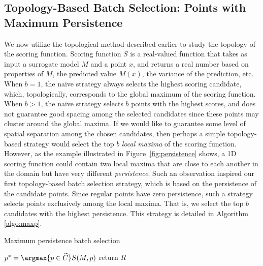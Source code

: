\subsection{Topology-Based Batch Selection: Points with Maximum Persistence}
\label{subsection:topology-maxp}

We now utilize the topological method described earlier to study the topology of the scoring function.
%
Scoring function $S$ is a real-valued function that takes as input a surrogate model $M$ and a point $x$, and returns a real number based on properties of $M$, the predicted value $M(x)$, the variance of the prediction, etc.
%
When $b = 1$, the naive strategy always selects the highest scoring candidate, which, topologically, corresponds to the global maximum of the scoring function.
%
When $b > 1$, the naive strategy selects $b$ points with the highest scores, and does not guarantee good spacing among the selected candidates since these points may cluster around the global maxima.
%
If we would like to guarantee some level of spatial separation among the chosen candidates, then perhaps a simple topology-based strategy would select the top $b$ \emph{local maxima} of the scoring function.
%
However, as the example illustrated in Figure~\ref{fig:persistence} shows, a 1D scoring function could contain two local maxima that are close to each another in the domain but have very different \emph{persistence}.
%
Such an observation inspired our first topology-based batch selection strategy, which is based on the persistence of the candidate points.
%
Since regular points have zero persistence, such a strategy selects points exclusively among the local maxima.
%
That is, we select the top $b$ candidates with the highest persistence.
%
This strategy is detailed in Algorithm \ref{algo:maxp}.

{\fontsize{10}{10}\selectfont
\begin{algorithm}
\scriptsize
\caption{Maximum persistence batch selection}
\label{algo:maxp}
\begin{algorithmic}
  \State $p^* = \argmax{p \in \widetilde{C}} S(M, p)$
\EndWhile
{}
\State return $R$
\EndProcedure
\end{algorithmic}
\end{algorithm}
}

